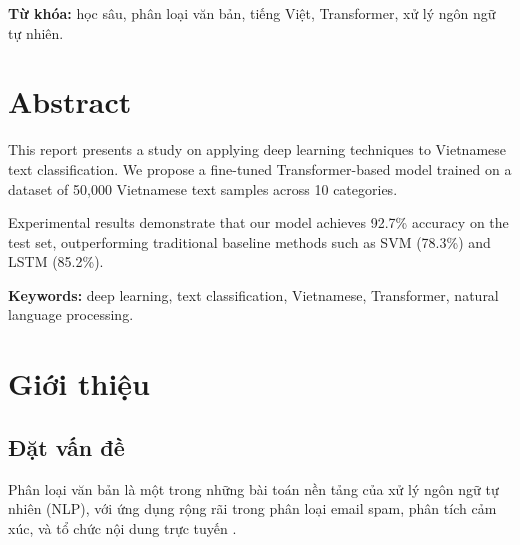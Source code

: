 \documentclass[12pt, a4paper]{report}
\begin{document}
\medskip
\noindent\textbf{Từ khóa:} học sâu, phân loại văn bản, tiếng Việt,
Transformer, xử lý ngôn ngữ tự nhiên.

\chapter*{Abstract}

This report presents a study on applying deep learning techniques to Vietnamese
text classification. We propose a fine-tuned Transformer-based model trained on
a dataset of 50,000 Vietnamese text samples across 10 categories.

Experimental results demonstrate that our model achieves 92.7\% accuracy on the
test set, outperforming traditional baseline methods such as SVM (78.3\%) and
LSTM (85.2\%).

\medskip
\noindent\textbf{Keywords:} deep learning, text classification, Vietnamese,
Transformer, natural language processing.

\tableofcontents
\newpage

\listoffigures
{}

\listoftables
{}
\newpage


\chapter{Giới thiệu}

\section{Đặt vấn đề}

Phân loại văn bản là một trong những bài toán nền tảng của xử lý ngôn ngữ
tự nhiên (NLP), với ứng dụng rộng rãi trong phân loại email spam, phân tích
cảm xúc, và tổ chức nội dung trực tuyến \cite{Goodfellow2016}.
\end{document}
